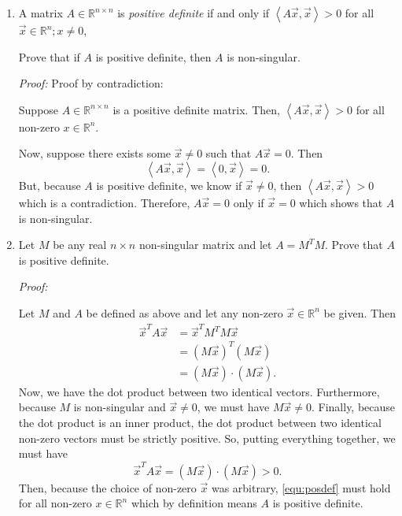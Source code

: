 \documentclass[a4paper,12pt]{article}
\newcommand{\reals}{\mathbb{R}}
\newcommand{\inner}[1]{\left\langle #1 \right\rangle}
\newenvironment{proof}[2][$\square$]
    {\setlength{\parskip}{0pt}\par\textit{Proof:} #2\setlength{\parskip}{0.25cm}
        \savebox{\qed}{#1}
        \begin{adjustwidth}{\widthof{Proof:}}{}
    }
    {
        \hfill\usebox{\qed}\end{adjustwidth}
    }
\begin{document}
\begin{enumerate}[label = \arabic*.]
    \item A matrix $ A \in \reals^{n \times n} $ is \emph{positive definite} if and only if $ \inner{A \vec{x}, \vec{x}} > 0 $ for all $ \vec{x} \in \reals^n; x \neq 0 $,
    
    Prove that if $ A $ is positive definite, then $ A $ is non-singular.
    
    \begin{proof}{Proof by contradiction:}
        Suppose $ A \in \reals^{n \times n} $ is a positive definite matrix. Then, $ \inner{A \vec{x}, \vec{x}} > 0 $ for all non-zero $ x \in \reals^n $. 
        
        Now, suppose there exists some $ \vec{x} \neq 0 $ such that $ A\vec{x} = 0 $. Then
        \[
            \inner{A\vec{x}, \vec{x}} = \inner{0, \vec{x}} = 0.
        \]
        But, because $ A $ is positive definite, we know if $ \vec{x} \neq 0 $, then $ \inner{A\vec{x}, \vec{x}} > 0$ which is a contradiction. Therefore, $ A\vec{x} = 0 $ only if $ \vec{x} = 0 $ which shows that $ A $ is non-singular.
    \end{proof}

    \item Let $ M $ be any real $ n \times n $ non-singular matrix and let $ A = M^T M $. Prove that $ A $ is positive definite.
    
    \begin{proof}{}
        Let $ M $ and $ A $ be defined as above and let any non-zero $ \vec{x} \in \reals^n $ be given. Then
        \begin{align*}
            \vec{x}^T A \vec{x} &= \vec{x}^T M^T M \vec{x} \\
            &= (M \vec{x})^T (M \vec{x}) \\
            &= (M \vec{x}) \cdot (M \vec{x}).
        \end{align*}
        Now, we have the dot product between two identical vectors. Furthermore, because $ M $ is non-singular and $ \vec{x} \neq 0 $, we must have $ M \vec{x} \neq 0 $. Finally, because the dot product is an inner product, the dot product between two identical non-zero vectors must be strictly positive. So, putting everything together, we must have
        \begin{equation}
            \vec{x}^T A \vec{x} = (M \vec{x}) \cdot (M \vec{x}) > 0. \label{equ:posdef}
        \end{equation}
        Then, because the choice of non-zero $ \vec{x} $ was arbitrary, \eqref{equ:posdef} must hold for all non-zero $ x \in \reals^n $ which by definition means $ A $ is positive definite.
    \end{proof}
\end{enumerate}
\end{document}
